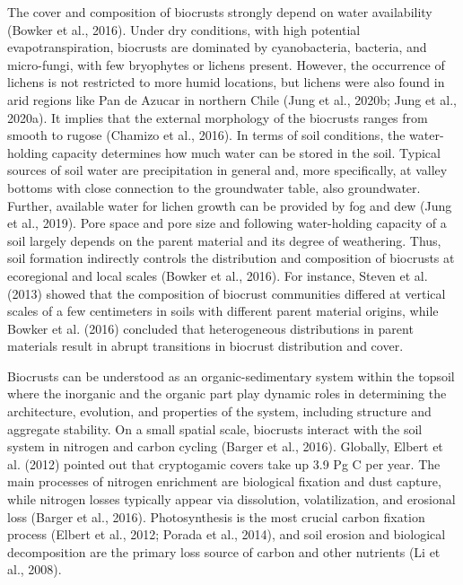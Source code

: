 The cover and composition of biocrusts strongly depend on water availability (Bowker et al., 2016). Under dry conditions, with high potential evapotranspiration, biocrusts are dominated by cyanobacteria, bacteria, and micro-fungi, with few bryophytes or lichens present. However, the occurrence of lichens is not restricted to more humid locations, but lichens were also found in arid regions like Pan de Azucar in northern Chile (Jung et al., 2020b; Jung et al., 2020a). It implies that the external morphology of the biocrusts ranges from smooth to rugose (Chamizo et al., 2016). In terms of soil conditions, the water-holding capacity determines how much water can be stored in the soil. Typical sources of soil water are precipitation in general and, more specifically, at valley bottoms with close connection to the groundwater table, also groundwater. Further, available water for lichen growth can be provided by fog and dew (Jung et al., 2019). Pore space and pore size and following water-holding capacity of a soil largely depends on the parent material and its degree of weathering. Thus, soil formation indirectly controls the distribution and composition of biocrusts at ecoregional and local scales (Bowker et al., 2016). For instance, Steven et al. (2013) showed that the composition of biocrust communities differed at vertical scales of a few centimeters in soils with different parent material origins, while Bowker et al. (2016) concluded that heterogeneous distributions in parent materials result in abrupt transitions in biocrust distribution and cover.

Biocrusts can be understood as an organic-sedimentary system within the topsoil where the inorganic and the organic part play dynamic roles in determining the architecture, evolution, and properties of the system, including structure and aggregate stability. On a small spatial scale, biocrusts interact with the soil system in nitrogen and carbon cycling (Barger et al., 2016). Globally, Elbert et al. (2012) pointed out that cryptogamic covers take up 3.9 Pg C per year. The main processes of nitrogen enrichment are biological fixation and dust capture, while nitrogen losses typically appear via dissolution, volatilization, and erosional loss (Barger et al., 2016). Photosynthesis is the most crucial carbon fixation process (Elbert et al., 2012; Porada et al., 2014), and soil erosion and biological decomposition are the primary loss source of carbon and other nutrients (Li et al., 2008).


